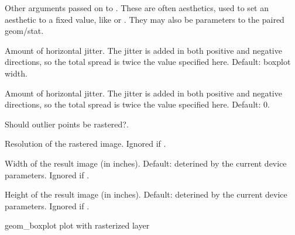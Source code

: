\documentclass[a4paper]{book}
\begin{document}
\begin{Arguments}
\begin{ldescription}
\item[\code{...}] Other arguments passed on to . These are
often aesthetics, used to set an aesthetic to a fixed value, like
 or . They may also be parameters
to the paired geom/stat.

\item[\code{outlier.jitter.width}] Amount of horizontal jitter. The jitter is added in both positive and negative directions,
so the total spread is twice the value specified here. Default: boxplot width.

\item[\code{outlier.jitter.height}] Amount of horizontal jitter. The jitter is added in both positive and negative directions,
so the total spread is twice the value specified here. Default: 0.

\item[\code{raster}] Should outlier points be rastered?.

\item[\code{raster.dpi}] Resolution of the rastered image. Ignored if .

\item[\code{raster.width}] Width of the result image (in inches). Default: deterined by the current device parameters. Ignored if .

\item[\code{raster.height}] Height of the result image (in inches). Default: deterined by the current device parameters. Ignored if .
\end{ldescription}
\end{Arguments}
%
\begin{Value}
geom\_boxplot plot with rasterized layer
\end{Value}
%
\end{document}
